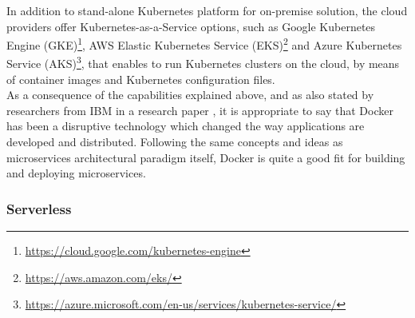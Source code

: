 \documentclass{Configuration_Files/PoliMi3i_thesis}
\begin{document}
In addition to stand-alone Kubernetes platform for on-premise solution, the cloud providers offer Kubernetes-as-a-Service options, such as Google Kubernetes Engine (GKE)\footnote{\href{https://cloud.google.com/kubernetes-engine}{https://cloud.google.com/kubernetes-engine}}, AWS Elastic Kubernetes Service (EKS)\footnote{\href{https://aws.amazon.com/eks/}{https://aws.amazon.com/eks/}} and Azure Kubernetes Service (AKS)\footnote{\href{https://azure.microsoft.com/en-us/services/kubernetes-service/}{https://azure.microsoft.com/en-us/services/kubernetes-service/}}, that enables to run Kubernetes clusters on the cloud, by means of container images and Kubernetes configuration files.
\\
As a consequence of the capabilities explained above, and as also stated by researchers from IBM in a research paper \cite{jaramillo2016leveraging}, it is appropriate to say that Docker has been a disruptive technology which changed the way applications are developed and distributed.
Following the same concepts and ideas as microservices architectural paradigm itself, Docker is quite a good fit for building and deploying microservices.

\subsubsection{Serverless}
\label{subsubsec:serverless}
\end{document}
